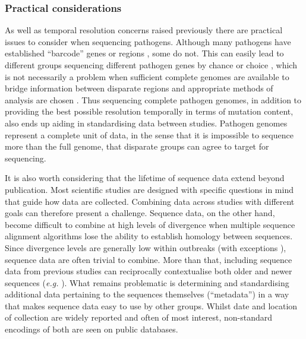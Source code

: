 \documentclass[11pt,oneside,letterpaper]{article}
\begin{document}
\subsubsection*{Practical considerations}
As well as temporal resolution concerns raised previously there are practical issues to consider when sequencing pathogens.
Although many pathogens have established ``barcode'' genes or regions \citep{towner_rapid_2004}, some do not.
This can easily lead to different groups sequencing different pathogen genes by chance or choice \citep{georges-courbot_isolation_1997,leroy_fruit_2005,rouquet_wild_2005}, which is not necessarily a problem when sufficient complete genomes are available to bridge information between disparate regions and appropriate methods of analysis are chosen \citep{dudas_phylogenetic_2014}.
Thus sequencing complete pathogen genomes, in addition to providing the best possible resolution temporally in terms of mutation content, also ends up aiding in standardising data between studies.
Pathogen genomes represent a complete unit of data, in the sense that it is impossible to sequence more than the full genome, that disparate groups can agree to target for sequencing.

It is also worth considering that the lifetime of sequence data extend beyond publication.
Most scientific studies are designed with specific questions in mind that guide how data are collected.
Combining data across studies with different goals can therefore present a challenge.
Sequence data, on the other hand, become difficult to combine at high levels of divergence when multiple sequence alignment algorithms lose the ability to establish homology between sequences.
Since divergence levels are generally low within outbreaks (with exceptions \citep{andersen_clinical_2015}), sequence data are often trivial to combine.
More than that, including sequence data from previous studies can reciprocally contextualise both older and newer sequences (\textit{e.g.} \cite{mena_origins_2016}).
What remains problematic is determining and standardising additional data pertaining to the sequences themselves (``metadata'') in a way that makes sequence data easy to use by other groups.
Whilst date and location of collection are widely reported and often of most interest, non-standard encodings of both are seen on public databases.
\end{document}

